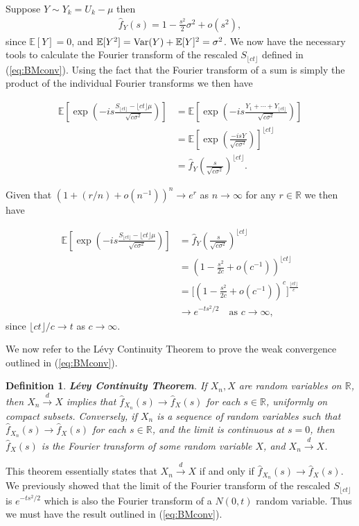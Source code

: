 \documentclass[honours,12pt,twoside, openright]{unswthesis}
\newcommand{\R}{\mathbb{R}}
\newcommand{\E}{\mathbb{E}}
\newcommand{\1}{\mathbf 1}
\newcommand{\Var}{\mathop{\rm Var}}
\newtheorem{definition}[equation]{Definition}
\numberwithin{equation}{section}
\theoremstyle{definition}
\theoremstyle{remark}
\begin{document}
Suppose $Y\sim Y_k=U_k-\mu$ then 
\begin{align}
\hat{f}_{Y}(s)=1-\frac{s^2}{2}\sigma^2+o(s^2),
\end{align}
\noindent since $\E[Y]=0$, and $\E[Y^2]=\Var(Y)+\E[Y]^2=\sigma^2$. We now have the necessary tools to calculate the Fourier transform of the rescaled $S_{\lfloor ct\rfloor}$ defined in (\ref{eq:BMconv}). Using the fact that the Fourier transform of a sum is simply the product of the individual Fourier transforms we then have

\begin{align}
	\E\left[\exp\left( -is\frac{S_{\lfloor ct\rfloor}-\lfloor ct \rfloor \mu}{\sqrt{c\sigma^2}}    \right)\right]
	&= \E\left[\exp\left( -is\frac{Y_1+\cdots+Y_{\lfloor ct\rfloor}}{\sqrt{c\sigma^2}}    \right)\right]\\
	&= \E\left[\exp\left( \frac{-isY}{\sqrt{c\sigma^2}}    \right)\right]^{\lfloor ct\rfloor}\\
	&=\hat{f}_{Y}\left(\frac{s}{\sqrt{c\sigma^2}}\right)^{\lfloor ct\rfloor}.
\end{align}

\noindent Given that $(1+(r/n)+o(n^{-1}))^n\to e^r$ as $n\to\infty$ for any $r\in\R$ we then have

\begin{align}
	\E\left[\exp\left( -is\frac{S_{\lfloor ct\rfloor}-\lfloor ct \rfloor \mu}{\sqrt{c\sigma^2}}    \right)\right]
	&=\hat{f}_{Y}\left(\frac{s}{\sqrt{c\sigma^2}}\right)^{\lfloor ct\rfloor}\nonumber\\
	&=\left(1-\frac{s^2}{2c}+o(c^{-1})\right)^{\lfloor ct\rfloor}\\
	&=\Bigg[\left(1-\frac{s^2}{2c}+o(c^{-1})\right)^c\Bigg]^\frac{\lfloor ct\rfloor}{c}\\	
	&\to e^{-ts^2/2} \quad\textrm{as $c\to\infty,$}
\end{align}
\noindent since $\lfloor ct\rfloor/c\to t$ as $c\to\infty.$

We now refer to the L\'{e}vy Continuity Theorem to prove the weak convergence outlined in (\ref{eq:BMconv}).\\

\begin{definition}\cite{thebook}\label{def:levyContinuity}
	\textbf{L\'{e}vy Continuity Theorem}. If $X_n,X$ are random variables on $\R$, then $X_n\overset{d}{\longrightarrow}X$ implies that $\hat{f}_{X_n}(s)\to\hat{f}_X(s)$ for each $s\in \R$, uniformly on compact subsets. Conversely, if $X_n$ is a sequence of random variables such that $\hat{f}_{X_n}(s)\to\hat{f}_X(s)$ for each $s\in \R$, and the limit is continuous at $s=0$, then $\hat{f}_X(s)$ is the Fourier transform of some random variable $X$, and $X_n\overset{d}{\longrightarrow}X$.\\
\end{definition}
\noindent This theorem essentially states that $X_n\overset{d}{\longrightarrow}X$ if and only if $\hat{f}_{X_n}(s)\to\hat{f}_X(s)$. We previously showed that the limit of the Fourier transform of the rescaled $S_{\lfloor ct\rfloor}$ is $e^{-ts^2/2}$ which is also the Fourier transform of a $N(0,t)$ random variable. Thus we must have the result outlined in (\ref{eq:BMconv}).
\end{document}
